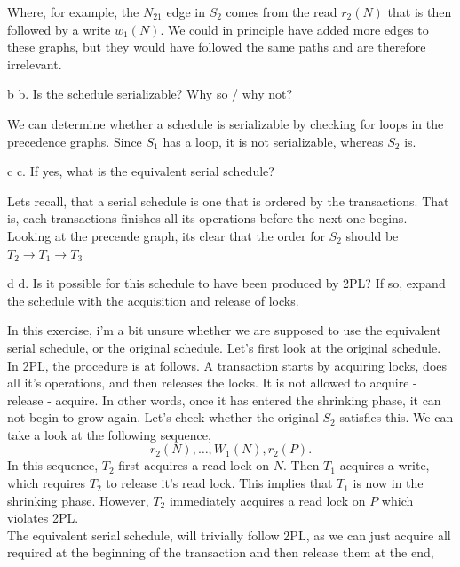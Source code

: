 \documentclass[working, oneside]{../../Preambles/tuftebook}
\begin{document}
Where, for example, the $N_{21}$ edge in $S_2$ comes from the read $r_2\left( N \right) $ that is then followed by a write $w_1\left( N \right) $. We could in principle have added more edges to these graphs, but they would have followed the same paths and are therefore irrelevant.
\begin{subexercise}{b}
b. Is the schedule serializable? Why so / why not?
\end{subexercise}
We can determine whether a schedule is serializable by checking for loops in the precedence graphs. Since $S_1$ has a loop, it is not serializable, whereas $S_2$ is.
\begin{subexercise}{c}
c. If yes, what is the equivalent serial schedule?
\end{subexercise}
Lets recall, that a serial schedule is one that is ordered by the transactions. That is, each transactions finishes all its operations before the next one begins. Looking at the precende graph, its clear that the order for $S_2$ should be $T_2 \to  T_1 \to T_3$
\begin{subexercise}{d}
d. Is it possible for this schedule to have been produced by 2PL? If so, expand the
schedule with the acquisition and release of locks.
\end{subexercise}
In this exercise, i'm a bit unsure whether we are supposed to use the equivalent serial schedule, or the original schedule. Let's first look at the original schedule. In 2PL, the procedure is at follows. A transaction starts by acquiring locks, does all it's operations, and then releases the locks. It is not allowed to acquire - release - acquire. In other words, once it has entered the shrinking phase, it can not begin to grow again. Let's check whether the original $S_2$ satisfies this. We can take a look at the following sequence,
\[
r_2\left( N \right) , \ldots , W_1\left( N \right) , r_2\left( P \right) 
.\] 
In this sequence, $T_2$ first acquires a read lock on $N$. Then $T_1$ acquires a write, which requires $T_2$ to release it's read lock. This implies that $T_1$ is now in the shrinking phase. However, $T_2$ immediately acquires a read lock on $P$ which violates 2PL. 
\\
The equivalent serial schedule, will trivially follow 2PL, as we can just acquire all required at the beginning of the transaction and then release them at the end,
\end{document}
